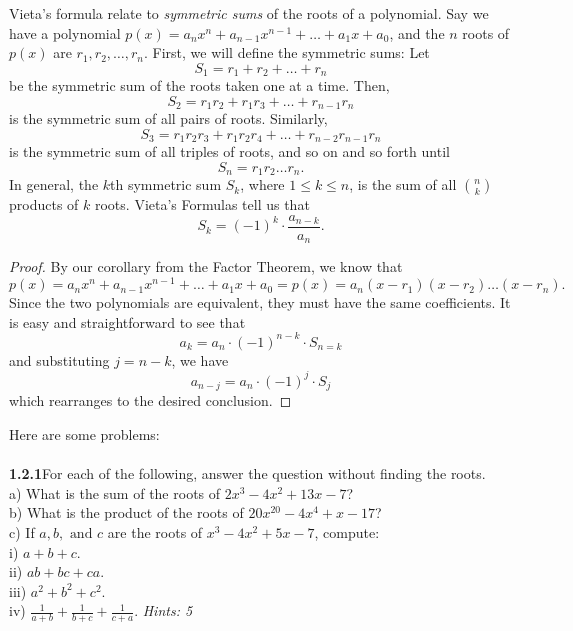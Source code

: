 \documentclass[12pt]{article}
\begin{document}
\begin{tcolorbox}[breakable, colback=green!10!white, colframe=green!25!black, title=Vieta's Formulas]
            Vieta's formula relate to \textit{symmetric sums} of the roots of a polynomial. Say we have a polynomial $p(x)=a_nx^n+a_{n-1}x^{n-1}+\dots+a_1x+a_0$, and the $n$ roots of $p(x)$ are $r_1,r_2,\dots,r_n$. First, we will define the symmetric sums:
            Let \[S_1=r_1+r_2+\dots+r_n\] be the symmetric sum of the roots taken one at a time. Then, \[S_2=r_1r_2+r_1r_3+\dots+r_{n-1}r_n\] is the symmetric sum of all pairs of roots. Similarly, \[S_3=r_1r_2r_3+r_1r_2r_4+\dots+r_{n-2}r_{n-1}r_n\] is the symmetric sum of all triples of roots, and so on and so forth until
            \[S_n=r_1r_2\dots r_n.\]
            In general, the $k$th symmetric sum $S_k$, where $1\le k\le n$, is the sum of all $\binom{n}{k}$ products of $k$ roots.
            Vieta's Formulas tell us that 
            \[S_k=(-1)^{k}\cdot\frac{a_{n-k}}{a_n}.\]
            \begin{proof}
                By our corollary from the Factor Theorem, we know that 
                \[p(x)=a_nx^n+a_{n-1}x^{n-1}+\dots+a_1x+a_0=p(x)=a_n(x-r_1)(x-r_2)\dots(x-r_n).\] Since the two polynomials are equivalent, they must have the same coefficients. It is easy and straightforward to see that
                \[a_k=a_n\cdot(-1)^{n-k}\cdot S_{n=k}\]
                and substituting $j=n-k$, we have
                \[a_{n-j}=a_n\cdot(-1)^j\cdot S_j\]
                which rearranges to the desired conclusion.
            \end{proof}
\end{tcolorbox}
Here are some problems:\\\\
\textbf{1.2.1}\quad For each of the following, answer the question without finding the roots.\\
\indent a) What is the sum of the roots of $2x^3-4x^2+13x-7$?\\
\indent b) What is the product of the roots of $20x^{20}-4x^4+x-17$?\\
\indent c) If $a,b,\text{ and } c$ are the roots of $x^3-4x^2+5x-7$, compute:\\
\indent\indent i) $a+b+c$.\\
\indent\indent ii) $ab+bc+ca$.\\
\indent\indent iii) $a^2+b^2+c^2$.\\
\indent\indent iv) $\frac{1}{a+b}+\frac{1}{b+c}+\frac{1}{c+a}$. \textit{Hints: 5}\\\\
\end{document}
